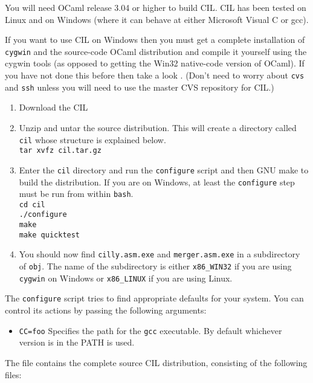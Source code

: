 \documentclass{article}
\newcommand{\hsp}{\hspace{0.5in}}
\def\t#1{{\tt #1}}
\begin{document}
You will need OCaml release 3.04 or higher to build CIL. CIL has been tested
on Linux and on Windows (where it can behave at either Microsoft Visual C or
gcc). 

 If you want to use CIL on Windows then you must get a complete installation
of \t{cygwin} and the source-code OCaml distribution and compile it yourself
using the cygwin tools (as opposed to getting the Win32 native-code version of
OCaml). If you have not done this before then take a look
. (Don't need to worry about \t{cvs} and
\t{ssh} unless you will need to use the master CVS repository for CIL.)

\begin{enumerate}
\item Download the CIL 
\item Unzip and untar the source distribution. This will create a directory
      called \t{cil} whose structure is explained below. \\
      \hsp\verb!tar xvfz cil.tar.gz!
\item Enter the \t{cil} directory and run the \t{configure} script and then 
      GNU make to build the distribution. If you are on Windows, at least the
      \t{configure} step must be run from within \t{bash}. \\
      \hsp\verb!cd cil!\\
      \hsp\verb!./configure!\\
      \hsp\verb!make!\\
      \hsp\verb!make quicktest!\\

\item You should now find \t{cilly.asm.exe} and \t{merger.asm.exe} in a
subdirectory of \t{obj}. The name of the subdirectory is either \t{x86\_WIN32}
if you are using \t{cygwin} on Windows or \t{x86\_LINUX} if you are using
Linux. 

\end{enumerate}

 The \t{configure} script tries to find appropriate defaults for your system.
You can control its actions by passing the following arguments:
\begin{itemize}
\item \t{CC=foo} Specifies the path for the \t{gcc} executable. By default
whichever version is in the PATH is used.
\end{itemize}

The file  contains the complete source CIL
distribution, consisting of the following files:
\end{document}
